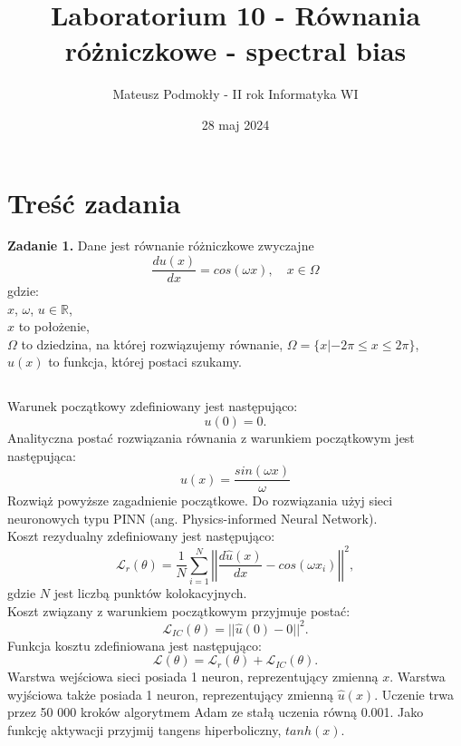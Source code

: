 \documentclass[11pt, leqno]{scrartcl}
\title{Laboratorium 10 - Równania różniczkowe - spectral bias}
\author{Mateusz Podmokły - II rok Informatyka WI}
\date{28 maj 2024}
\begin{document}
    \maketitle
    \section{Treść zadania}
    \textbf{Zadanie 1.} Dane jest równanie różniczkowe zwyczajne
    \[
        \frac{du(x)}{dx}=cos(\omega x), \quad x \in \Omega
    \]
    gdzie: \\
    $x$, $\omega$, $u \in \mathbb{R}$, \\
    $x$ to położenie, \\
    $\Omega$ to dziedzina, na której rozwiązujemy równanie,
    $\Omega=\{x|-2\pi \leq x \leq 2\pi\}$, \\
    $u(x)$ to funkcja, której postaci szukamy.

    \subsection*{}
    Warunek początkowy zdefiniowany jest następująco:
    \[
        u(0)=0.
    \]
    Analityczna postać rozwiązania równania z warunkiem
    początkowym jest następująca:
    \[
        u(x)=\frac{sin(\omega x)}{\omega}
    \]
    Rozwiąż powyższe zagadnienie początkowe. Do rozwiązania
    użyj sieci neuronowych typu PINN (ang. Physics-informed Neural
    Network). \\
    Koszt rezydualny zdefiniowany jest następująco:
    \[
        \mathcal{L}_r(\theta)=\frac{1}{N}\sum_{i=1}^{N}
            \left| \left| \frac{d\hat{u}(x)}{dx}-cos(\omega x_i)
            \right| \right| ^2,
    \]
    gdzie $N$ jest liczbą punktów kolokacyjnych. \\
    Koszt związany z warunkiem początkowym przyjmuje postać:
    \[
        \mathcal{L}_{IC}(\theta)=||\hat{u}(0)-0||^2.
    \]
    Funkcja kosztu zdefiniowana jest następująco:
    \[
        \mathcal{L}(\theta)=\mathcal{L}_r(\theta)+
            \mathcal{L}_{IC}(\theta).
    \]
    Warstwa wejściowa sieci posiada 1 neuron, reprezentujący
    zmienną $x$. Warstwa wyjściowa także posiada 1 neuron,
    reprezentujący zmienną $\hat{u}(x)$. Uczenie trwa
    przez 50 000 kroków algorytmem Adam ze stałą uczenia równą
    0.001. Jako funkcję aktywacji przyjmij tangens hiperboliczny,
    $tanh(x)$.
\end{document}
